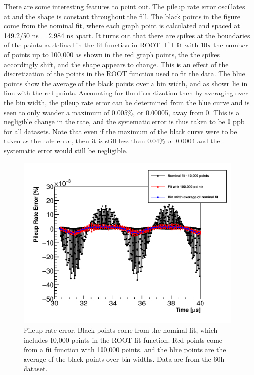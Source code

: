 There are some interesting features to point out. The pileup rate error oscillates at \wa and the shape is constant throughout the fill. The black points in the figure come from the nominal fit, where each graph point is calculated and spaced at 149.2/50 ns = 2.984 ns apart. It turns out that there are spikes at the boundaries of the points as defined in the fit function in ROOT. If I fit with 10x the number of points up to 100,000 as shown in the red graph points, the the spikes accordingly shift, and the shape appears to change. This is an effect of the discretization of the points in the ROOT function used to fit the data. The blue points show the average of the black points over a bin width, and as shown lie in line with the red points. Accounting for the discretization then by averaging over the bin width, the pileup rate error can be determined from the blue curve and is seen to only wander a maximum of 0.005\%, or 0.00005, away from 0. This is a negligible change in the rate, and the systematic error is thus taken to be 0 ppb for all datasets. Note that even if the maximum of the black curve were to be taken as the rate error, then it is still less than 0.04\% or 0.0004 and the systematic error would still be negligible.


\begin{figure}
    \centering
    \includegraphics[width=.8\textwidth]{PileupRateError}
    \caption[]{Pileup rate error. Black points come from the nominal fit, which includes 10,000 points in the ROOT fit function. Red points come from a fit function with 100,000 points, and the blue points are the average of the black points over bin widths. Data are from the 60h dataset.}
    \label{fig:pileupRateError}
\end{figure}

